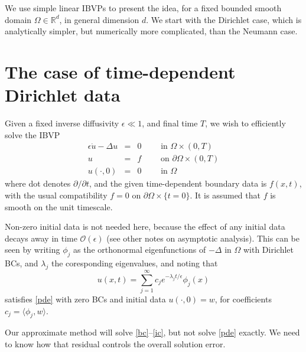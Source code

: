 \documentclass[10pt]{article}
\newcommand{\bea}{\begin{eqnarray}}
\newcommand{\eea}{\end{eqnarray}}
\newcommand{\R}{\mathbb{R}}
\newcommand{\bigO}{{\mathcal O}}
\newcommand{\pO}{{\partial\Omega}}
\newcommand{\eps}{\epsilon}
\begin{document}
We use simple linear IBVPs to present the idea, for a fixed
bounded smooth domain $\Omega \in \R^d$, in general dimension $d$.
We start with the Dirichlet case, which is
analytically simpler, but numerically more complicated,
than the Neumann case.


\section{The case of time-dependent Dirichlet data}

Given a fixed inverse diffusivity $\eps\ll 1$,
and final time $T$,
we wish to efficiently solve the IBVP
\bea
\eps\dot{u} - \Delta u &=& 0    \qquad \mbox{ in } \Omega\times (0,T)
\label{pde}
\\
u  &=& f  \qquad \mbox{ on } \pO \times (0,T)
\label{bc}
\\
u(\cdot, 0)    &=&  0 \qquad \mbox{ in } \Omega
\label{ic}
\eea
where dot denotes $\partial/\partial t$, and the given
time-dependent boundary data is $f(x,t)$,
with the usual compatibility $f=0$ on  $\pO\times\{t=0\}$.
It is assumed that $f$ is smooth on the unit timescale.

Non-zero initial data is not needed here,
because the effect of any initial data decays away
in time $\bigO(\eps)$ (see other notes on asymptotic analysis).
This can be seen by writing $\phi_j$ as the orthonormal eigenfunctions
of $-\Delta$ in $\Omega$ with Dirichlet BCs, and $\lambda_j$
the coresponding eigenvalues, and noting that
$$
u(x,t) = \sum_{j=1}^\infty c_j e^{-\lambda_jt/\eps} \phi_j(x)
$$
satisfies \eqref{pde} with zero BCs and initial data $u(\cdot,0)=w$,
for coefficients $c_j = \langle \phi_j, w \rangle$.

Our approximate method will solve \eqref{bc}--\eqref{ic}, but
not solve \eqref{pde} exactly.
We need to know how that residual controls the overall solution error.
\end{document}
